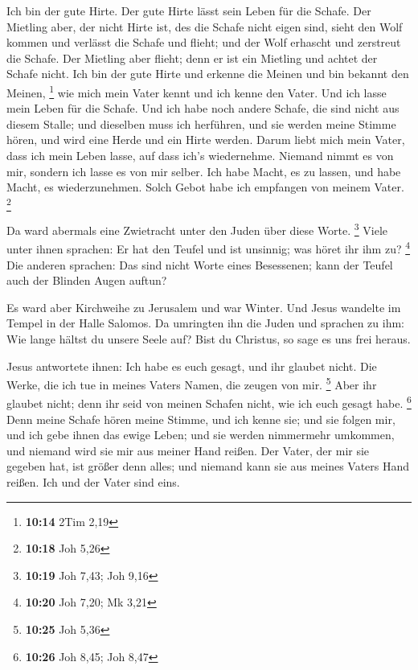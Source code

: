  Ich bin der gute Hirte. Der gute Hirte lässt sein Leben
für die Schafe.  Der Mietling aber, der nicht Hirte ist,
des die Schafe nicht eigen sind, sieht den Wolf kommen und verlässt die
Schafe und flieht; und der Wolf erhascht und zerstreut die Schafe.
 Der Mietling aber flieht; denn er ist ein Mietling und
achtet der Schafe nicht.  Ich bin der gute Hirte und
erkenne die Meinen und bin bekannt den Meinen, \footnote{\textbf{10:14}
  2Tim 2,19}  wie mich mein Vater kennt und ich kenne den
Vater. Und ich lasse mein Leben für die Schafe.  Und ich
habe noch andere Schafe, die sind nicht aus diesem Stalle; und dieselben
muss ich herführen, und sie werden meine Stimme hören, und wird eine
Herde und ein Hirte werden.  Darum liebt mich mein Vater,
dass ich mein Leben lasse, auf dass ich's wiedernehme. 
Niemand nimmt es von mir, sondern ich lasse es von mir selber. Ich habe
Macht, es zu lassen, und habe Macht, es wiederzunehmen. Solch Gebot habe
ich empfangen von meinem Vater. \footnote{\textbf{10:18} Joh 5,26}

 Da ward abermals eine Zwietracht unter den Juden über
diese Worte. \footnote{\textbf{10:19} Joh 7,43; Joh 9,16} 
Viele unter ihnen sprachen: Er hat den Teufel und ist unsinnig; was
höret ihr ihm zu? \footnote{\textbf{10:20} Joh 7,20; Mk 3,21}
 Die anderen sprachen: Das sind nicht Worte eines
Besessenen; kann der Teufel auch der Blinden Augen auftun?

 Es ward aber Kirchweihe zu Jerusalem und war Winter.
 Und Jesus wandelte im Tempel in der Halle Salomos.
 Da umringten ihn die Juden und sprachen zu ihm: Wie lange
hältst du unsere Seele auf? Bist du Christus, so sage es uns frei
heraus.

 Jesus antwortete ihnen: Ich habe es euch gesagt, und ihr
glaubet nicht. Die Werke, die ich tue in meines Vaters Namen, die zeugen
von mir. \footnote{\textbf{10:25} Joh 5,36}  Aber ihr
glaubet nicht; denn ihr seid von meinen Schafen nicht, wie ich euch
gesagt habe. \footnote{\textbf{10:26} Joh 8,45; Joh 8,47} 
Denn meine Schafe hören meine Stimme, und ich kenne sie; und sie folgen
mir,  und ich gebe ihnen das ewige Leben; und sie werden
nimmermehr umkommen, und niemand wird sie mir aus meiner Hand reißen.
 Der Vater, der mir sie gegeben hat, ist größer denn alles;
und niemand kann sie aus meines Vaters Hand reißen.  Ich
und der Vater sind eins.

